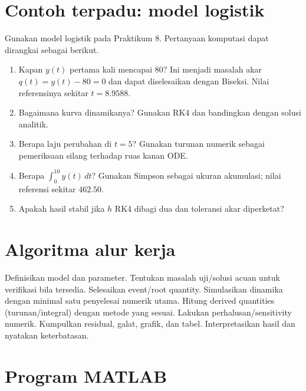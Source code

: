 \documentclass[book,english,noindex,lean,nobackpage,nocopyright,noupdate,nofiglist,notablist]{enacom}
\begin{document}
\section{Contoh terpadu: model logistik}
Gunakan model logistik pada Praktikum 8. Pertanyaan komputasi dapat dirangkai sebagai berikut.
\begin{enumerate}
\item Kapan $y(t)$ pertama kali mencapai 80? Ini menjadi masalah akar $q(t)=y(t)-80=0$ dan dapat diselesaikan dengan Biseksi. Nilai referensinya sekitar $t=8.9588$.
\item Bagaimana kurva dinamikanya? Gunakan RK4 dan bandingkan dengan solusi analitik.
\item Berapa laju perubahan di $t=5$? Gunakan turunan numerik sebagai pemeriksaan silang terhadap ruas kanan ODE.
\item Berapa $\int_0^{10} y(t)\,dt$? Gunakan Simpson sebagai ukuran akumulasi; nilai referensi sekitar $462.50$.
\item Apakah hasil stabil jika $h$ RK4 dibagi dua dan toleransi akar diperketat?
\end{enumerate}

\section{Algoritma alur kerja}
\begin{algorithm}
\caption{Mini-pipeline numerik}
\begin{algorithmic}[1]
\State Definisikan model dan parameter.
\State Tentukan masalah uji/solusi acuan untuk verifikasi bila tersedia.
\State Selesaikan event/root quantity.
\State Simulasikan dinamika dengan minimal satu penyelesai numerik utama.
\State Hitung derived quantities (turunan/integral) dengan metode yang sesuai.
\State Lakukan perhalusan/sensitivity numerik.
\State Kumpulkan residual, galat, grafik, dan tabel.
\State Interpretasikan hasil dan nyatakan keterbatasan.
\end{algorithmic}
\end{algorithm}

\section{Program MATLAB}

\end{document}
